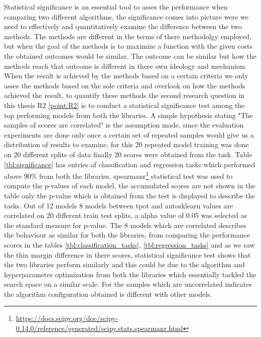 Statistical significance is an essential tool to asses the performance when comparing two different algorithms, the significance comes into picture were we need to effectively and quantitatively examine the difference between the two methods. The methods are different in the terms of there methodolgy employed, but when the goal of the methods is to maximize a function with the given costs the obtained outcomes would be similar. The outcome can be similar but how the methods reach that outcome is different in there own ideology and mechanism. When the result is achieved by the methods based on a certain criteria we only asses the methods based on the sole criteria and overlook on how the methods achieved the result, to quantify these methods the second research question in this thesis R2 \ref{point:R2} is to conduct a statistical significance test among the top performing models from both the libraries. A simple hypothesis stating "The samples of scores are correlated" is the assumption made, since the evaluation experiments are done only once a certain set of repeated samples would give us a distribution of results to examine, for this 20 repeated model training was done on 20 different splits of data finally 20 scores were obtained from the task. Table \ref{tbl:significance} has entries of classification and regression tasks which performed above 90\% from both the libraries. spearmanr\footnote{\url{https://docs.scipy.org/doc/scipy-0.14.0/reference/generated/scipy.stats.spearmanr.html}} statistical test was used to compute the p-values of each model, the accumulated scores are not shown in the table only the p-value which is obtained from the test is displayed to describe the tasks. Out of 12 models 8 models between tpot and autosklearn values are correlated on 20 different train test splits, a alpha value of 0.05 was selected as the standard measure for p-value. The 8 models which are correlated describes the behaviour as similar for both the libraries, from comparing the performance scores in the tables \ref{tbl:classification_tasks}, \ref{tbl:regression_tasks} and as we saw the thin margin difference in there scores, statistical significance test shows that the two libraries perform similarly and this could be due to the algorithm and hyperparameter optimization from both the libraries which essentially tackled the search space on a similar scale. For the samples which are uncorrelated indicates the algorithm configuration obtained is different with other models.

